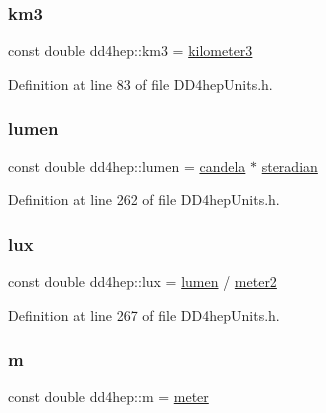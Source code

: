 \subsubsection{\texorpdfstring{km3}{km3}}
{\footnotesize\ttfamily const double dd4hep\+::km3 = \hyperlink{namespacedd4hep_a4501dea229a9ace2c46c427c69ddb5aa}{kilometer3}\hspace{0.3cm}{\ttfamily [static]}}



Definition at line 83 of file D\+D4hep\+Units.\+h.

\hypertarget{namespacedd4hep_aca4ed36739bef9c651a4ced5a2279b40}{}\label{namespacedd4hep_aca4ed36739bef9c651a4ced5a2279b40} 
\subsubsection{\texorpdfstring{lumen}{lumen}}
{\footnotesize\ttfamily const double dd4hep\+::lumen = \hyperlink{namespacedd4hep_ad6c9a17d1f654cad2f47f590edc1bec4}{candela} $\ast$ \hyperlink{namespacedd4hep_a0a902cdeced2ad28da2d32515e540867}{steradian}\hspace{0.3cm}{\ttfamily [static]}}



Definition at line 262 of file D\+D4hep\+Units.\+h.

\hypertarget{namespacedd4hep_a1c9daf57c558025c205072d26d477a99}{}\label{namespacedd4hep_a1c9daf57c558025c205072d26d477a99} 
\subsubsection{\texorpdfstring{lux}{lux}}
{\footnotesize\ttfamily const double dd4hep\+::lux = \hyperlink{namespacedd4hep_aca4ed36739bef9c651a4ced5a2279b40}{lumen} / \hyperlink{namespacedd4hep_afe718b0d811af6b4d45c556e3a0e87a3}{meter2}\hspace{0.3cm}{\ttfamily [static]}}



Definition at line 267 of file D\+D4hep\+Units.\+h.

\hypertarget{namespacedd4hep_a443d1517e365c8f0c3a498bff0f09088}{}\label{namespacedd4hep_a443d1517e365c8f0c3a498bff0f09088} 
\subsubsection{\texorpdfstring{m}{m}}
{\footnotesize\ttfamily const double dd4hep\+::m = \hyperlink{namespacedd4hep_a46f5cf0231796af4296a307a58812b06}{meter}\hspace{0.3cm}{\ttfamily [static]}}



